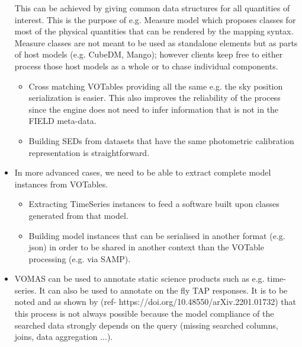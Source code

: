 \begin{itemize}
  This can be achieved by giving  common data structures for all 
  quantities of interest. This is the purpose of e.g. Measure model 
  which proposes classes for most of the physical quantities that can 
  be rendered by the mapping syntax. Measure classes are not meant to 
  be used as standalone elements but as parts of host models 
  (e.g. CubeDM, Mango);
  however clients keep free to either process those host models as a
  whole or to chase individual components.
    \begin{itemize}
      \item Cross matching VOTables providing all the same e.g. the sky position serialization is easier.
            This also improves the reliability of the process since the engine does not need to infer information that is not in the FIELD meta-data.
      \item Building SEDs from datasets that have the same photometric calibration representation is straightforward.
   \end{itemize}          

  \item In more advanced cases, we need to be able to extract complete model instances from VOTables.
    \begin{itemize}
      \item Extracting  TimeSeries instances to feed a software built upon classes generated from that model.
      \item Building model instances that can be serialised in another format (e.g. json) in order to be shared in another context than 
            the VOTable processing (e.g. via SAMP).
   \end{itemize}         
    
   \item VOMAS can be used to annotate static science products such as e.g. time-series. It can also be used to annotate 
   on the fly TAP responses.
   It is to be noted and as shown by (ref- https://doi.org/10.48550/arXiv.2201.01732) that this process is not always 
   possible because the model compliance of the searched data strongly depends 
   on the query (missing searched columns, joins, data aggregation ...). 
   
    
\end{itemize} 

